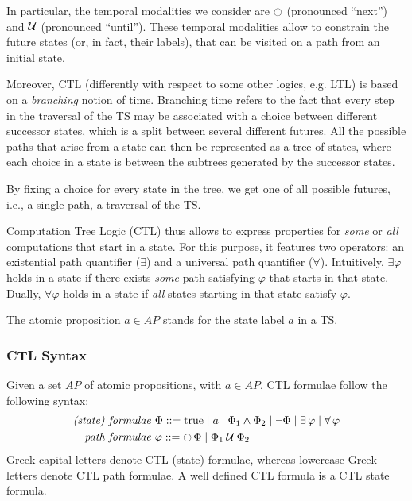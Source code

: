 \documentclass{article}
\begin{document}
In particular, the temporal modalities we consider are $\ocircle$ (pronounced ``next'') 
and $\mathbin{\mathcal{U}}$ (pronounced ``until''). These temporal modalities allow to constrain the future states 
(or, in fact, their labels), that can be visited on a path from an initial state.

Moreover, CTL (differently with respect to some other logics, e.g. LTL) is based on a \emph{branching} notion of time. 
Branching time refers to the fact that every step in the traversal of the TS may be associated with a choice between different successor states, 
which is a split between several different futures. All the possible paths that arise from a state can then be represented
as a tree of states, where each choice in a state is between the subtrees generated by the successor states.

By fixing a choice for every state in the tree, we get one of all possible futures, i.e., a single path, a traversal of the TS.

Computation Tree Logic (CTL) thus allows to express properties for \emph{some} or \emph{all} computations that start in a state. 
For this purpose, it features two operators: an existential path quantifier ($\exists$) and a universal path quantifier ($\forall$). 
Intuitively, $\exists \varphi$ holds in a state if there exists \emph{some} path satisfying $\varphi$ that starts in that state. 
Dually, $\forall \varphi$ holds in a state if \emph{all} states starting in that state satisfy $\varphi$.

The atomic proposition $a \in AP$ stands for the state label $a$ in a TS.

\subsubsection*{CTL Syntax}
Given a set $AP$ of atomic propositions, with $a \in AP$, CTL formulae follow the following syntax: 
\begin{align*}
    \emph{(state) formulae } & \Phi ::= \text{true} \mid a \mid \Phi_1 \land \Phi_2 \mid \neg \Phi \mid \exists \, \varphi \mid \forall \, \varphi \\
    \emph{path formulae   }    & \varphi ::= \mathop{\ocircle}{\Phi} \mid \Phi_1 \mathbin{\mathcal{U}} \Phi_2 \\
\end{align*}
Greek capital letters denote CTL (state) formulae, whereas lowercase Greek letters denote CTL path formulae. 
A well defined CTL formula is a CTL state formula.
\end{document}

